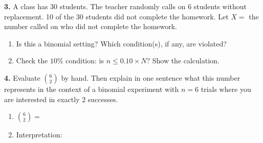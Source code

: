 \documentclass[10pt]{article}
\begin{document}
\begin{practicebox}
\tcbbreak
\vspace{8pt}
\textbf{3.} A class has 30 students. The teacher randomly calls on 6 students without
replacement. 10 of the 30 students did not complete the homework.
Let $X =$ the number called on who did not complete the homework.
\begin{enumerate}[label=(\alph*), leftmargin=2em, itemsep=8pt]
  \item Is this a binomial setting? Which condition(s), if any, are violated?\\
  \item Check the $10\%$ condition: is $n \le 0.10 \times N$? Show the calculation.\\
\end{enumerate}

\vspace{8pt}
\textbf{4.} Evaluate $\binom{6}{2}$ by hand. Then explain in one sentence what this
number represents in the context of a binomial experiment with $n = 6$ trials where
you are interested in exactly 2 successes.
\begin{enumerate}[label=(\alph*), leftmargin=2em, itemsep=8pt]
  \item $\binom{6}{2} = $ \makebox[3cm][l]{\hspace{1.6cm}\smash{\raisebox{-4pt}{\gradedblank[id=hw4a, type=short, points=1, answer=15, check=numeric, tolerance=0]{1.3cm}{0.2in}}}}
  \item Interpretation:\\
\end{enumerate}


\end{practicebox}
\end{document}
